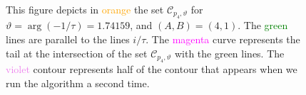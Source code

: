 \documentclass[12pt,reqno]{amsart}
\theoremstyle{definition}
\def\calC{\mathcal C}
\renewcommand{\=}{\;=\;}
\begin{document}
\begin{figure}[ht]
\begin{tiny}
\end{tiny}
\caption{This figure depicts in \textcolor{orange}{orange} the set $\calC_{p_4,\vartheta}$ for $\vartheta=\arg(-1/\tau)=1.74159$, and $(A,B)=(4,1)$. The \textcolor{green}{green} lines are parallel to the lines $i/\tau$. The \textcolor{magenta}{magenta} curve represents the tail at the intersection of the set $\calC_{p_4,\vartheta}$ with the green lines. The \textcolor{violet}{violet} contour represents half of the contour that appears when we run the algorithm a second time.}
\label{fig:thimb.A4B1.II}
\end{figure}
%
%
%
%
\end{document}
